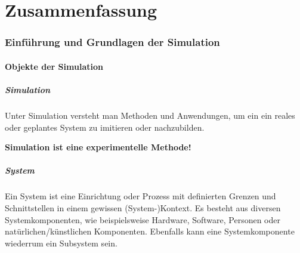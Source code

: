 


\newcommand{\INSTITUTE}{University of Applied Science Rapperswil}
\newcommand{\SUBJECT}{System Modelling and Simulation}
\newcommand{\TITLE}{Zusammenfassung inkl. Cheatsheet}
\newcommand{\AUTHORONE}{Severin Dellsperger}



\tableofcontents
\newpage



\part{Zusammenfassung}
\section{Einführung und Grundlagen der Simulation}
\subsection{Objekte der Simulation}
\subsubsection{Simulation}
Unter Simulation versteht man Methoden und Anwendungen, um ein ein reales oder geplantes System zu imitieren oder nachzubilden.
\begin{center}
\textbf{Simulation ist eine experimentelle Methode!}
\end{center}
\subsubsection{System}
Ein System ist eine Einrichtung oder Prozess mit definierten Grenzen und Schnittstellen in einem gewissen (System-)Kontext. Es besteht aus diversen Systemkomponenten, wie beispielsweise Hardware, Software, Personen oder natürlichen/künstlichen Komponenten. Ebenfalls kann eine Systemkomponente wiederrum ein Subsystem sein.

